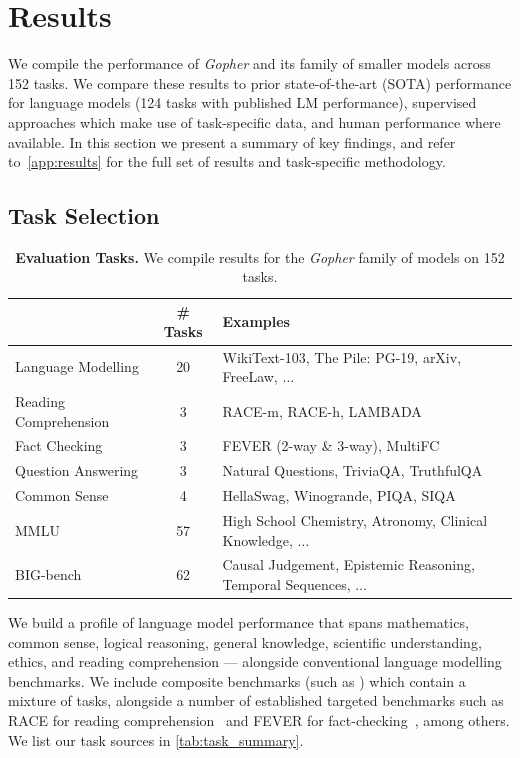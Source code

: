 \documentclass[11pt, a4paper, logo, internal, copyright, nonumbering]{deepmind}
\newcommand{\gopher}{\textit{Gopher}\xspace}
\newcommand{\bigbench}{BIG-bench\xspace}
\begin{document}
\section{Results}
\label{sec:results}
We compile the performance of \gopher and its family of smaller models across 152 tasks. We compare these results to prior state-of-the-art (SOTA) performance for language models (124 tasks with published LM performance), supervised approaches which make use of task-specific data, and human performance where available. In this section we present a summary of key findings, and refer to~\autoref{app:results} for the full set of results and task-specific methodology.  

\subsection{Task Selection}
\begin{table}
    \centering
    \begin{tabular}{l c l}
    \toprule
        & \# Tasks & Examples \\
    \midrule
    Language Modelling & 20  & {\small WikiText-103, The Pile: PG-19, arXiv, FreeLaw, $\ldots$} \\ 
    Reading Comprehension & 3 & {\small RACE-m, RACE-h, LAMBADA} \\
    Fact Checking & 3 & {\small FEVER (2-way \& 3-way), MultiFC} \\
    Question Answering & 3 & {\small Natural Questions, TriviaQA, TruthfulQA} \\
    Common Sense & 4 & {\small HellaSwag, Winogrande, PIQA, SIQA} \\
    MMLU & 57 & {\small High School Chemistry, Atronomy, Clinical Knowledge, $\ldots$} \\
    \bigbench & 62 & {\small Causal Judgement, Epistemic Reasoning, Temporal Sequences, $\ldots$}  \\
    \bottomrule
    \end{tabular}
    \caption{\textbf{Evaluation Tasks.} We compile results for the \gopher family of models on 152 tasks.}
    \label{tab:task_summary}
\end{table}

We build a profile of language model performance that spans mathematics, common sense, logical reasoning, general knowledge, scientific understanding, ethics, and reading comprehension --- alongside conventional language modelling benchmarks. 
We include composite benchmarks (such as \citet{bigbench}) which contain a mixture of tasks, alongside a number of established targeted benchmarks such as RACE for reading comprehension~\citep{race} and FEVER for fact-checking~\citep{fever}, among others. We list our task sources in \autoref{tab:task_summary}.
\end{document}

